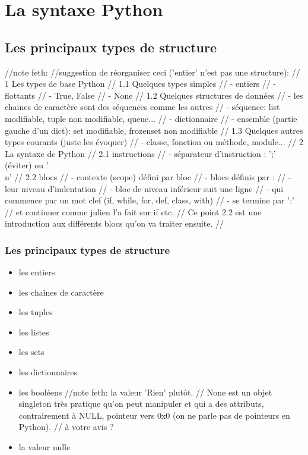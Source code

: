 \section{La syntaxe Python}
\subsection{Les principaux types de structure}
//note feth:
//suggestion de réorganiser ceci ('entier' n'est pas une structure):
// 1 Les types de base Python
// 1.1 Quelques types simples
//     - entiers
//     - flottants
//     - True, False
//     - None
// 1.2 Quelques structures de données
//     - les chaines de caractère sont des séquences comme les autres
//     - séquence: list modifiable, tuple non modifiable, queue...
//     - dictionnaire
//     - ensemble (partie gauche d'un dict): set modifiable, frozenset non modifiable
// 1.3 Quelques autres types courants (juste les évoquer)
//     - classe, fonction ou méthode, module...
// 2 La syntaxe de Python
// 2.1 instructions
//     - séparateur d'instruction : ';' (éviter) ou '\\n'
// 2.2 blocs
//     - contexte (scope) défini par bloc
//     - blocs définis par :
//       - leur niveau d'indentation
//       - bloc de niveau inférieur suit une ligne
//         - qui commence par un mot clef (if, while, for, def, class, with)
//         - se termine par ':'
// et continuer comme julien l'a fait sur if etc.
// Ce point 2.2 est une introduction aux différents blocs qu'on va traiter ensuite.
//

\begin{frame}
  \frametitle{Les principaux types de structure}
    \begin{itemize}
      \item<1-> les entiers
      \item<2-> les chaînes de caractère
      \item<3-> les tuples
      \item<4-> les listes
      \item<5-> les sets
      \item<6-> les dictionnaires
      \item<7-> les booléens
      //note feth: la valeur 'Rien' plutôt.
      // None est un objet singleton très pratique qu'on peut manipuler et qui a des attributs, contrairement à NULL, pointeur vers 0x0 (on ne parle pas de pointeurs en Python).
      // à votre avis ?
      \item<8-> la valeur nulle
    \end{itemize}
\end{frame}

